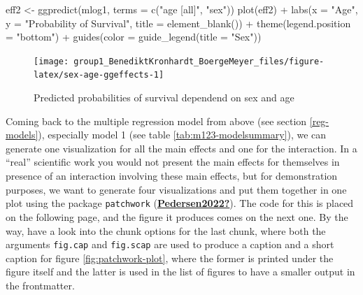 \documentclass[
  11pt,
  a4paper,
  twoside]{scrbook}
\newenvironment{Shaded}{\begin{snugshade}}{\end{snugshade}}
\newcommand{\AttributeTok}[1]{\textcolor[rgb]{0.77,0.63,0.00}{#1}}
\newcommand{\FunctionTok}[1]{\textcolor[rgb]{0.00,0.00,0.00}{#1}}
\newcommand{\NormalTok}[1]{#1}
\newcommand{\OtherTok}[1]{\textcolor[rgb]{0.56,0.35,0.01}{#1}}
\newcommand{\SpecialCharTok}[1]{\textcolor[rgb]{0.00,0.00,0.00}{#1}}
\newcommand{\StringTok}[1]{\textcolor[rgb]{0.31,0.60,0.02}{#1}}
\begin{document}
\begin{Shaded}
\begin{Highlighting}[]
\NormalTok{eff2 }\OtherTok{\textless{}{-}} \FunctionTok{ggpredict}\NormalTok{(mlog1, }\AttributeTok{terms =} \FunctionTok{c}\NormalTok{(}\StringTok{"age [all]"}\NormalTok{, }\StringTok{"sex"}\NormalTok{))}
\FunctionTok{plot}\NormalTok{(eff2) }\SpecialCharTok{+} \FunctionTok{labs}\NormalTok{(}\AttributeTok{x =} \StringTok{"Age"}\NormalTok{, }\AttributeTok{y =} \StringTok{"Probability of Survival"}\NormalTok{,}
                  \AttributeTok{title =} \FunctionTok{element\_blank}\NormalTok{()) }\SpecialCharTok{+} 
    \FunctionTok{theme}\NormalTok{(}\AttributeTok{legend.position =} \StringTok{"bottom"}\NormalTok{) }\SpecialCharTok{+}
    \FunctionTok{guides}\NormalTok{(}\AttributeTok{color =} \FunctionTok{guide\_legend}\NormalTok{(}\AttributeTok{title =} \StringTok{"Sex"}\NormalTok{))}
\end{Highlighting}
\end{Shaded}

\linespread{1}

\begin{figure}[H]

{\centering \texttt{[image: group1\_BenediktKronhardt\_BoergeMeyer\_files/figure-latex/sex-age-ggeffects-1]} 

}

\caption{Predicted probabilities of survival dependend on sex and age}\label{fig:sex-age-ggeffects}
\end{figure}

Coming back to the multiple regression model from above (see section \ref{reg-models}), especially model 1 (see table \ref{tab:m123-modelsummary}), we can generate one visualization for all the main effects and one for the interaction. In a ``real'' scientific work you would not present the main effects for themselves in presence of an interaction involving these main effects, but for demonstration purposes, we want to generate four visualizations and put them together in one plot using the package \texttt{patchwork} (\protect\hyperlink{ref-Pedersen2022}{\textbf{Pedersen2022?}}). The code for this is placed on the following page, and the figure it produces comes on the next one. By the way, have a look into the chunk options for the last chunk, where both the arguments \texttt{fig.cap} and \texttt{fig.scap} are used to produce a caption and a short caption for figure \ref{fig:patchwork-plot}, where the former is printed under the figure itself and the latter is used in the list of figures to have a smaller output in the frontmatter.
\end{document}
